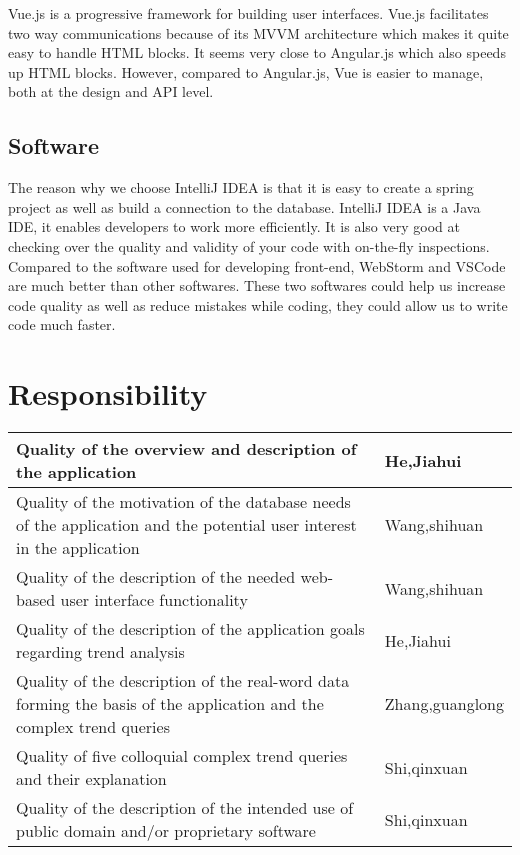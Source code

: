 \documentclass[]{article}
\begin{document}
	\noindent Vue.js is a progressive framework for building user interfaces. Vue.js facilitates two way communications because of its MVVM architecture which makes it quite easy to handle HTML blocks. It seems very close to Angular.js which also speeds up HTML blocks. However, compared to Angular.js, Vue is easier to manage, both at the design and API level.   

	\subsection{Software}
	
	\noindent The reason why we choose IntelliJ IDEA is that it is easy to create a spring project as well as build a connection to the database. IntelliJ IDEA is a Java IDE, it enables developers to work more efficiently. It is also very good at checking over the quality and validity of your code with on-the-fly inspections. \\
	
	\noindent Compared to the software used for developing front-end, WebStorm and VSCode are much better than other softwares. These two softwares could help us increase code quality as well as reduce mistakes while coding, they could allow us to write code much faster. 

\section{Responsibility}
	\begin{table}[H]
		\centering
		\begin{tabular}{|p{12cm}|l|}
			\hline
			Quality of the overview and description of the application & He,Jiahui \\ 
			\hline
			Quality of the motivation of the database needs of the application and the potential user interest in the application &  Wang,shihuan  \\ 
			\hline
			Quality of the description of the needed web-based user interface functionality & Wang,shihuan \\
			\hline
			Quality of the description of the application goals regarding trend analysis & He,Jiahui \\ 
			\hline
			Quality of the description of the real-word data forming the basis of the application and the complex trend queries & Zhang,guanglong   \\ 
			\hline
			Quality of five colloquial complex trend queries and their explanation & Shi,qinxuan  \\ 
			\hline
			Quality of the description of the intended use of public domain and/or proprietary software & Shi,qinxuan  \\ 
			\hline
		\end{tabular}
	\end{table}
\end{document}
